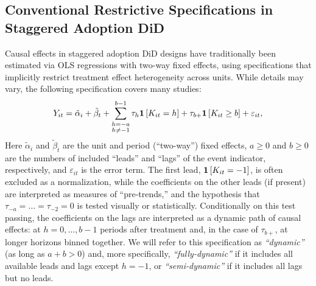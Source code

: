 \documentclass[english,11pt]{article}
\theoremstyle{plain}
\theoremstyle{plain}
\theoremstyle{plain}
\theoremstyle{plain}
\begin{document}
\subsection{Conventional Restrictive Specifications in Staggered Adoption DiD}

Causal effects in staggered adoption DiD designs have traditionally
been estimated via OLS regressions with two-way fixed effects, using
specifications that implicitly restrict treatment effect heterogeneity
across units. While details may vary, the following specification
covers many studies:
\begin{equation}
Y_{it}=\tilde{\alpha}_{i}+\tilde{\beta}_{t}+\sum_{\substack{h=-a\\
h\ne-1
}
}^{b-1}\tau_{h}\mathbf{1}\left[K_{it}=h\right]+\tau_{b+}\mathbf{1}\left[K_{it}\ge b\right]+\varepsilon_{it},\label{eq:dynamicOLS}
\end{equation}
Here $\tilde{\alpha}_{i}$ and $\tilde{\beta}_{t}$ are the unit and
period (``two-way'') fixed effects, $a\ge0$ and $b\ge0$ are the
numbers of included ``leads'' and ``lags'' of the event indicator,
respectively, and $\varepsilon_{it}$ is the error term. The first
lead, $\mathbf{1}\left[K_{it}=-1\right]$, is often excluded as a normalization,
while the coefficients on the other leads (if present) are interpreted
as measures of ``pre-trends,'' and the hypothesis that $\tau_{-a}=\dots=\tau_{-2}=0$
is tested visually or statistically. Conditionally on this test passing,
the coefficients on the lags are interpreted as a dynamic path of
causal effects: at $h=0,\dots,b-1$ periods after treatment and, in
the case of $\tau_{b+}$, at longer horizons binned together. We will
refer to this specification as \emph{``dynamic''} (as long as $a+b>0$)
and, more specifically, \emph{``fully-dynamic''} if it includes
all available leads and lags except $h=-1$, or \emph{``semi-dynamic''}
if it includes all lags but no leads.
\end{document}

